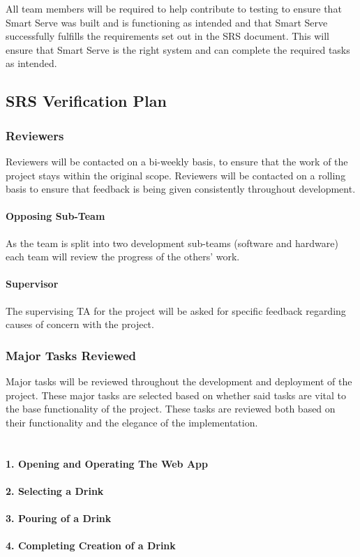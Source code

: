 \documentclass[12pt, titlepage]{article}
\begin{document}
All team members will be required to help contribute to testing to ensure that Smart Serve was built and is functioning as intended and that Smart Serve successfully fulfills the requirements set out in the SRS document. This will ensure that Smart Serve is the right system and can complete the required tasks as intended.


\subsection{SRS Verification Plan}

\subsubsection{Reviewers}
Reviewers will be contacted on a bi-weekly basis, to ensure that the work of the project stays within the original scope. Reviewers will be contacted on a rolling basis to ensure that feedback is being given consistently throughout development.

\paragraph{Opposing Sub-Team}
\newline
As the team is split into two development sub-teams  (software and hardware) each team will review the progress of the others' work.

\paragraph{Supervisor}\newline
The supervising TA for the project will be asked for specific feedback regarding causes of concern with the project.

\subsubsection{Major Tasks Reviewed}
Major tasks will be reviewed throughout the development and deployment of the project. These major tasks are selected based on whether said tasks are vital to the base functionality of the project. These tasks are reviewed both based on their functionality and the elegance of the implementation.\\

\\\\ \indent \textbf{1. Opening and Operating The Web App}
\\\\ \indent \textbf{2. Selecting a Drink}
\\\\ \indent \textbf{3. Pouring of a Drink}
\\\\ \indent \textbf{4. Completing Creation of a Drink}
\end{document}
